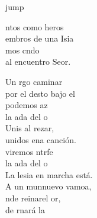 \begin{cancion}jump\\
	\begin{chorus}%
		ntos como heros\\
		embros de una Isia\\
		mos cndo\\
		al encuentro  Seor.\jump\\
	\end{chorus}%
	Un rgo caminar\\
	por el desto bajo el  \\
	 podemos az \\
	 la ada del o\\
	\jump
	Unis al rezar,\\
	unidos ena canción.  \\
	viremos ntrfe\\
	 la ada del o\\
	\jump
	La lesia en marcha está.\\
	A un munnuevo vamoa,\\
	nde reinarel or,\\
	de rnará la \\
\end{cancion}%

